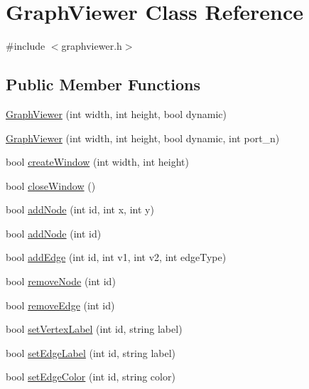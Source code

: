 \hypertarget{class_graph_viewer}{}\section{Graph\+Viewer Class Reference}
\label{class_graph_viewer}


{\ttfamily \#include $<$graphviewer.\+h$>$}

\subsection*{Public Member Functions}
\begin{DoxyCompactItemize}
\item 
\mbox{\hyperlink{class_graph_viewer_a8adc614f4fc290a3efcec7d7ceb1c58a}{Graph\+Viewer}} (int width, int height, bool dynamic)
\item 
\mbox{\hyperlink{class_graph_viewer_ad9d7b1d8b4ba8ef18517eae0e68568a2}{Graph\+Viewer}} (int width, int height, bool dynamic, int port\+\_\+n)
\item 
bool \mbox{\hyperlink{class_graph_viewer_ae5247dc66449dcd21fc5d531bbbaddfa}{create\+Window}} (int width, int height)
\item 
bool \mbox{\hyperlink{class_graph_viewer_a85990c1eaac7feed3950960d4bd2fd4c}{close\+Window}} ()
\item 
bool \mbox{\hyperlink{class_graph_viewer_a5421e86ac76433876309236ba96e70a2}{add\+Node}} (int id, int x, int y)
\item 
bool \mbox{\hyperlink{class_graph_viewer_ab9be856eb5f45284719a3bb119ec01ea}{add\+Node}} (int id)
\item 
bool \mbox{\hyperlink{class_graph_viewer_aad0c1448c37f744209ffb671f1bd0015}{add\+Edge}} (int id, int v1, int v2, int edge\+Type)
\item 
bool \mbox{\hyperlink{class_graph_viewer_a0c418639bb911eb827cabf895915f775}{remove\+Node}} (int id)
\item 
bool \mbox{\hyperlink{class_graph_viewer_a9a8ee68c7c12b373affbe4069dd95d72}{remove\+Edge}} (int id)
\item 
bool \mbox{\hyperlink{class_graph_viewer_ac25d7d007022fda16799808ba136e909}{set\+Vertex\+Label}} (int id, string label)
\item 
bool \mbox{\hyperlink{class_graph_viewer_a447cca0064e785654c2105602c2961ca}{set\+Edge\+Label}} (int id, string label)
\item 
bool \mbox{\hyperlink{class_graph_viewer_a07ccc96707efae4aa5f3ced3dca015af}{set\+Edge\+Color}} (int id, string color)

\end{DoxyCompactItemize}
